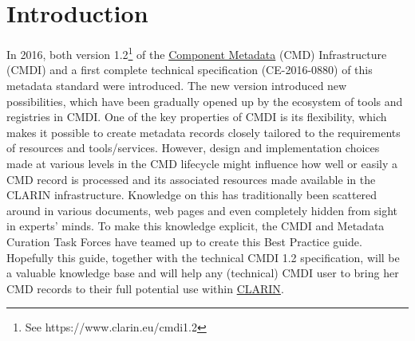 \documentclass[]{article}
\date{}
\begin{document}
\section{Introduction}\label{introduction}

In 2016, both version 1.2\footnote{See https://www.clarin.eu/cmdi1.2} of
the
\href{https://www.gitbook.com/book/clarin-eric/cmdi-best-practices/edit\#}{Component
Metadata} (CMD) Infrastructure (CMDI) and a first complete technical
specification (CE-2016-0880) of this metadata standard were introduced.
The new version introduced new possibilities, which have been gradually
opened up by the ecosystem of tools and registries in CMDI. One of the
key properties of CMDI is its flexibility, which makes it possible to
create metadata records closely tailored to the requirements of
resources and tools/services. However, design and implementation choices
made at various levels in the CMD lifecycle might influence how well or
easily a CMD record is processed and its associated resources made
available in the CLARIN infrastructure. Knowledge on this has
traditionally been scattered around in various documents, web pages and
even completely hidden from sight in experts' minds. To make this
knowledge explicit, the CMDI and Metadata Curation Task Forces have
teamed up to create this Best Practice guide. Hopefully this guide,
together with the technical CMDI 1.2 specification, will be a valuable
knowledge base and will help any (technical) CMDI user to bring her CMD
records to their full potential use within
\href{https://www.clarin.eu}{CLARIN}.
\end{document}
